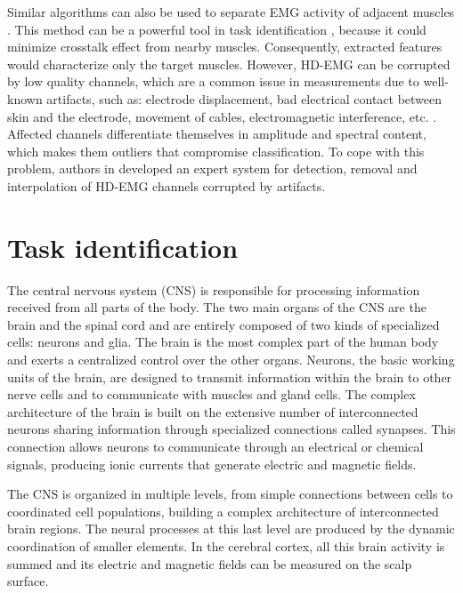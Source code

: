 Similar algorithms can also be used to separate EMG activity of adjacent muscles \citep{Farina2004, Holobar2014}. This method can be a powerful tool in task identification \citep{Naik2007}, because it could minimize crosstalk effect from nearby muscles. Consequently, extracted features would characterize only the target muscles.
However, HD-EMG can be corrupted by low quality channels, which are a common issue in measurements due to well-known artifacts, such as: electrode displacement, bad electrical contact between skin and the electrode, movement of cables, electromagnetic interference, etc. \citep{Clancy2002b}. Affected channels differentiate themselves in amplitude and spectral content, which makes them outliers that compromise classification. To cope with this problem, authors in \citep{Rojas-Martinez2012} developed an expert system for detection, removal and interpolation of HD-EMG channels corrupted by artifacts.



\section{Task identification}


The central nervous system (CNS) is responsible for processing information received from all parts of the body. The two main organs of the CNS are the brain and the spinal cord and are entirely composed of two kinds of specialized cells: neurons and glia. The brain is the most complex part of the human body and exerts a centralized control over the other organs. Neurons, the basic working units of the brain, are designed to transmit information within the brain to other nerve cells and to communicate with muscles and gland cells. The complex architecture of the brain is built on the extensive number of interconnected neurons sharing information through specialized connections called synapses. This connection allows  neurons to communicate through an electrical or chemical signals, producing ionic currents that generate electric and magnetic fields. 

The CNS is organized in multiple levels, from simple connections between cells to coordinated cell populations, building a complex architecture of interconnected brain regions. The neural processes at this last level are produced by the dynamic coordination of smaller elements. In the cerebral cortex, all this brain activity is summed and its electric and magnetic fields can be measured on the scalp surface. 


